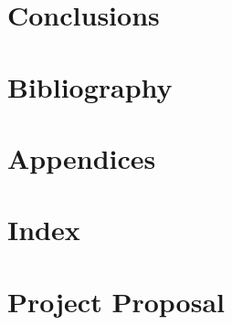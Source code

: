 \documentclass[10pt,twoside,a4paper]{article}
\begin{document}
\section{Conclusions}

\section{Bibliography}

\section{Appendices}

\section{Index}

\section{Project Proposal}
\end{document}
